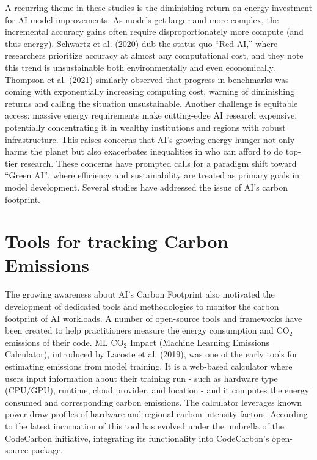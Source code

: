 \documentclass[a4paper,singleside,12pt]{report} %
\begin{document}
A recurring theme in these studies is the diminishing return on energy investment for AI model improvements.
As models get larger and more complex, the incremental accuracy gains often require disproportionately more 
compute (and thus energy). Schwartz et al. (2020) \cite{GreenAI} dub the status quo “Red AI,” where 
researchers prioritize accuracy at almost any computational cost, and they note this trend is unsustainable 
both environmentally and even economically. Thompson et al. (2021) \cite{thompson2021deeplearning} similarly
observed that progress in benchmarks was coming with exponentially increasing computing cost, warning of 
diminishing returns and calling the situation unsustainable. Another challenge is equitable access: massive 
energy requirements make cutting-edge AI research expensive, potentially concentrating it in wealthy 
institutions and regions with robust infrastructure. This raises concerns that AI's growing energy hunger 
not only harms the planet but also exacerbates inequalities in who can afford to do top-tier research. These 
concerns have prompted calls for a paradigm shift toward “Green AI”, where efficiency and sustainability are 
treated as primary goals in model development. Several studies have addressed the issue of AI's carbon 
footprint. 

\section{Tools for tracking Carbon Emissions}

The growing awareness about AI's Carbon Footprint also motivated the development of dedicated tools and
methodologies to monitor the carbon footprint of AI workloads. A number of open-source tools and frameworks
have been created to help practitioners measure the energy consumption and $\mathrm{CO_2}$ emissions of their
code. ML $\mathrm{CO_2}$ Impact (Machine Learning Emissions Calculator), introduced by Lacoste et al. (2019),
\cite{lacoste2019quantifying} was one of the early tools for estimating emissions from model training. It is a 
web-based calculator where users input  information about their training run - such as hardware type (CPU/GPU), runtime, 
cloud provider, and location - and it computes the energy consumed and corresponding carbon emissions. 
The calculator leverages known power draw profiles of  hardware and regional carbon intensity factors. According to
\cite{bannour-etal-2021-evaluating}
the latest incarnation of this tool has evolved under the umbrella of the CodeCarbon initiative, integrating its 
functionality into CodeCarbon's open-source package.
    
\end{document}
